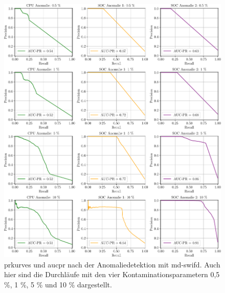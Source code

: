 \begin{figure}[t!]
    \centering
        \includegraphics[width=1\linewidth]{ch5_anomalieerkennung/abbildungen/MDSWIFD_PR_AUC_PR.pdf}
    \caption{\centering \acp*{prkurve} und \acs*{aucpr} nach der Anomaliedetektion mit \acs*{md-swifd}. Auch hier sind die Durchläufe mit den vier
    Kontaminationsparametern 0,5 \%, 1 \%, 5 \% und 10 \% dargestellt.}
    \label{fig:MDSWIFD_AUC_PR}
\end{figure}

